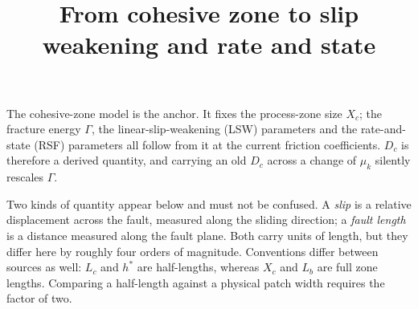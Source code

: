 \documentclass[11pt]{article}
\title{From cohesive zone to slip weakening and rate and state}
\begin{document}
\maketitle

The cohesive-zone model is the anchor. It fixes the process-zone size $X_c$; the fracture energy $\Gamma$, the linear-slip-weakening (LSW) parameters and the rate-and-state (RSF) parameters all follow from it at the current friction coefficients. $D_c$ is therefore a derived quantity, and carrying an old $D_c$ across a change of $\mu_k$ silently rescales $\Gamma$.

Two kinds of quantity appear below and must not be confused. A \emph{slip} is a relative displacement across the fault, measured along the sliding direction; a \emph{fault length} is a distance measured along the fault plane. Both carry units of length, but they differ here by roughly four orders of magnitude. Conventions differ between sources as well: $L_c$ and $h^{*}$ are half-lengths, whereas $X_c$ and $L_b$ are full zone lengths. Comparing a half-length against a physical patch width requires the factor of two.
\end{document}
